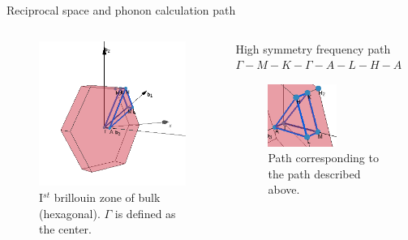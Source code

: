 \documentclass[dvipsnames]{beamer}
\begin{document}
	    \begin{frame}{Reciprocal space and phonon calculation path \cite{SeeK}} \label{fr:path}
	    \begin{columns}[T] %
			\begin{column}{.40\textwidth}
			\begin{figure}
			\centering
			\includegraphics[width=\textwidth]{brillouin.png}
			\caption{I$^{st}$ brillouin zone of bulk  (hexagonal). $\Gamma$ is defined as the center.}
			\end{figure}
			\end{column}
			\hfill
			\begin{column}{.60\textwidth}
			\begin{block}{High symmetry frequency path}\label{eq:path}
			    $\Gamma - M - K - \Gamma - A - L - H - A$
			\end{block}
			\begin{figure}
			\centering
			\includegraphics[width=0.6\textwidth]{brillouin_path.png}
			\caption{Path corresponding to the path described above.}
			\end{figure}
			\end{column}
		\end{columns}
	    \end{frame}
	
\end{document}
